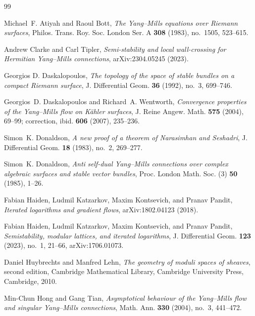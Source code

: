 \documentclass[11pt]{amsart}
\theoremstyle{definition}
\theoremstyle{remark}
\begin{document}
\begin{thebibliography}{99}

Michael~F. Atiyah and Raoul Bott, \emph{The {Y}ang--{M}ills equations
over {R}iemann surfaces}, Philos. Trans. Roy. Soc. London Ser. A
\textbf{308} (1983), no.~1505, 523--615.

Andrew Clarke and Carl Tipler, \emph{Semi-stability and local wall-crossing
for {H}ermitian {Y}ang--{M}ills connections}, arXiv:2304.05245 (2023).

Georgios D. Daskalopoulos, \emph{The topology of the space of stable
bundles on a compact {R}iemann surface}, J. Differential Geom.
\textbf{36} (1992), no.~3, 699--746.

Georgios~D. Daskalopoulos and Richard~A. Wentworth, \emph{Convergence
properties of the {Y}ang--{M}ills flow on {K}\"ahler surfaces}, J. Reine
Angew. Math. \textbf{575} (2004), 69--99; correction, ibid.
\textbf{606} (2007), 235--236.

Simon~K. Donaldson, \emph{A new proof of a theorem of {N}arasimhan and
{S}eshadri}, J. Differential Geom. \textbf{18} (1983), no.~2, 269--277.

Simon~K. Donaldson, \emph{Anti self-dual {Y}ang--{M}ills connections over
complex algebraic surfaces and stable vector bundles}, Proc. London Math.
Soc. (3) \textbf{50} (1985), 1--26.

Fabian Haiden, Ludmil Katzarkov, Maxim Kontsevich, and Pranav Pandit,
\emph{Iterated logarithms and gradient flows}, arXiv:1802.04123 (2018).

Fabian Haiden, Ludmil Katzarkov, Maxim Kontsevich, and Pranav Pandit,
\emph{Semistability, modular lattices, and iterated logarithms},
J. Differential Geom. \textbf{123} (2023), no.~1, 21--66,
arXiv:1706.01073.

Daniel Huybrechts and Manfred Lehn, \emph{The geometry of moduli spaces
of sheaves}, second edition, Cambridge Mathematical Library, Cambridge
University Press, Cambridge, 2010.

Min-Chun Hong and Gang Tian, \emph{Asymptotical behaviour of the
{Y}ang--{M}ills flow and singular {Y}ang--{M}ills connections}, Math. Ann.
\textbf{330} (2004), no.~3, 441--472.


\end{thebibliography}
\end{document}
